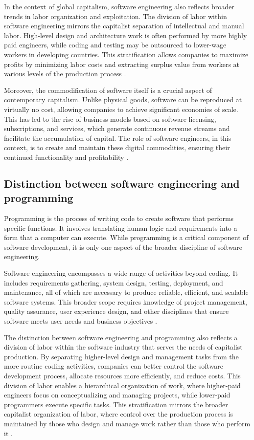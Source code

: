 \begin{refsection}
In the context of global capitalism, software engineering also reflects broader trends in labor organization and exploitation. The division of labor within software engineering mirrors the capitalist separation of intellectual and manual labor. High-level design and architecture work is often performed by more highly paid engineers, while coding and testing may be outsourced to lower-wage workers in developing countries. This stratification allows companies to maximize profits by minimizing labor costs and extracting surplus value from workers at various levels of the production process \cite[pp.~71-73]{braverman_1974}.

Moreover, the commodification of software itself is a crucial aspect of contemporary capitalism. Unlike physical goods, software can be reproduced at virtually no cost, allowing companies to achieve significant economies of scale. This has led to the rise of business models based on software licensing, subscriptions, and services, which generate continuous revenue streams and facilitate the accumulation of capital. The role of software engineers, in this context, is to create and maintain these digital commodities, ensuring their continued functionality and profitability \cite[pp.~315-317]{marx_2008}.

\subsection{Distinction between software engineering and programming}
Programming is the process of writing code to create software that performs specific functions. It involves translating human logic and requirements into a form that a computer can execute. While programming is a critical component of software development, it is only one aspect of the broader discipline of software engineering.

Software engineering encompasses a wide range of activities beyond coding. It includes requirements gathering, system design, testing, deployment, and maintenance, all of which are necessary to produce reliable, efficient, and scalable software systems. This broader scope requires knowledge of project management, quality assurance, user experience design, and other disciplines that ensure software meets user needs and business objectives \cite[pp.~32-34]{humphrey_1995}.

The distinction between software engineering and programming also reflects a division of labor within the software industry that serves the needs of capitalist production. By separating higher-level design and management tasks from the more routine coding activities, companies can better control the software development process, allocate resources more efficiently, and reduce costs. This division of labor enables a hierarchical organization of work, where higher-paid engineers focus on conceptualizing and managing projects, while lower-paid programmers execute specific tasks. This stratification mirrors the broader capitalist organization of labor, where control over the production process is maintained by those who design and manage work rather than those who perform it \cite[pp.~58-60]{braverman_1974}.


\end{refsection}
